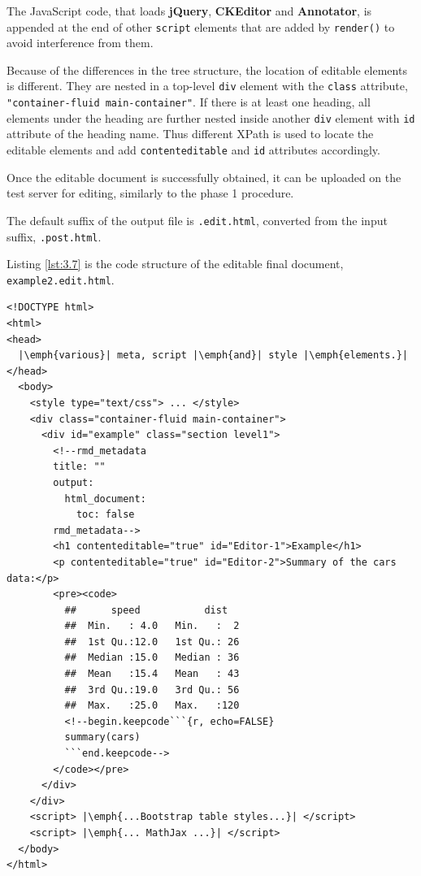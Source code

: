 \documentclass[a4paper, 12pt]{report}
\begin{document}
The JavaScript code, that loads \textbf{jQuery}, \textbf{CKEditor} and \textbf{Annotator}, is appended at the end of other \texttt{script} elements that are added by \texttt{render()} to avoid interference from them.

Because of the differences in the tree structure, the location of editable elements is different. They are nested in a top-level \texttt{div} element with the \texttt{class} attribute, \texttt{"container-fluid main-container"}. If there is at least one heading, all elements under the heading are further nested inside another \texttt{div} element with \texttt{id} attribute of the heading name. Thus different XPath is used to locate the editable elements and add \texttt{contenteditable} and \texttt{id} attributes accordingly.

Once the editable document is successfully obtained, it can be uploaded on the test server for editing, similarly to the phase 1 procedure.

The default suffix of the output file is \texttt{.edit.html}, converted from the input suffix, \texttt{.post.html}.

Listing \ref{lst:3.7} is the code structure of the editable final document, \texttt{example2.edit.html}.
\begin{lstlisting}[caption={(tidied) \texttt{example2.edit.html}}, escapechar=\|, label={lst:3.7}]
<!DOCTYPE html>
<html>
<head>
  |\emph{various}| meta, script |\emph{and}| style |\emph{elements.}|
</head>
  <body>
    <style type="text/css"> ... </style>
    <div class="container-fluid main-container">
      <div id="example" class="section level1">
        <!--rmd_metadata
        title: ""
        output:
          html_document:
            toc: false
        rmd_metadata-->
        <h1 contenteditable="true" id="Editor-1">Example</h1>
        <p contenteditable="true" id="Editor-2">Summary of the cars data:</p>
        <pre><code>
          ##      speed           dist    
    	  ##  Min.   : 4.0   Min.   :  2  
    	  ##  1st Qu.:12.0   1st Qu.: 26  
    	  ##  Median :15.0   Median : 36  
    	  ##  Mean   :15.4   Mean   : 43  
    	  ##  3rd Qu.:19.0   3rd Qu.: 56  
    	  ##  Max.   :25.0   Max.   :120
    	  <!--begin.keepcode```{r, echo=FALSE}
    	  summary(cars)
    	  ```end.keepcode-->
    	</code></pre>
      </div>
    </div>
    <script> |\emph{...Bootstrap table styles...}| </script>
    <script> |\emph{... MathJax ...}| </script>    
  </body>
</html>
\end{lstlisting}
\end{document}
